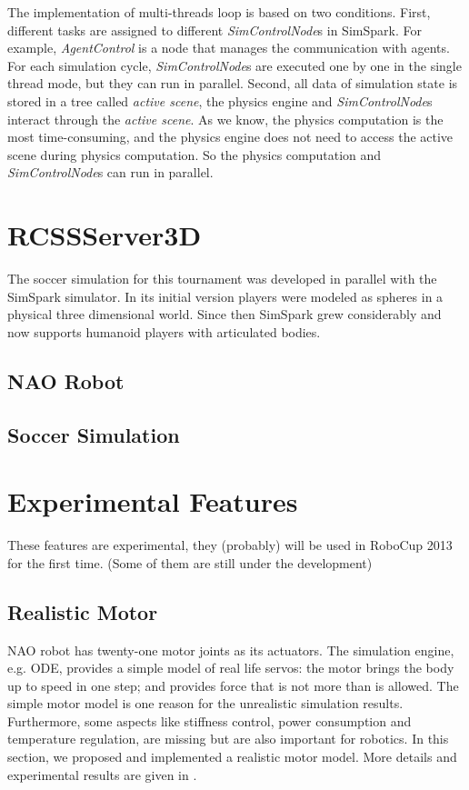 \documentclass{llncs}
\begin{document}
The implementation of multi-threads loop is based on two conditions.
First, different tasks are assigned to different \textit{SimControlNode}s in SimSpark.
For example, \textit{AgentControl} is a node that manages the communication with agents.
For each simulation cycle, \textit{SimControlNode}s are executed one by one in the single thread mode, but they can run in parallel.
Second, all data of simulation state is stored in a tree called \textit{active scene},
the physics engine and \textit{SimControlNode}s interact through the \textit{active scene}.
As we know, the physics computation is the most time-consuming, and the physics engine does not need to access the active scene during physics computation.
So the physics computation and \textit{SimControlNode}s can run in parallel.


\section{RCSSServer3D}
\label{s:rcssserver3d}

The soccer simulation for this tournament was developed in parallel with the SimSpark simulator. In its initial version players were modeled as spheres in a physical three dimensional world. Since then SimSpark grew considerably and now supports humanoid players with articulated bodies.

\subsection{NAO Robot}
\subsection{Soccer Simulation}

\section{Experimental Features}
\label{s:ongoing}
These features are experimental, they (probably) will be used in RoboCup 2013 for the first time. (Some of them are still under the development)

\subsection{Realistic Motor}
NAO robot has twenty-one motor joints as its actuators.
The simulation engine, e.g. ODE, provides a simple model of real life servos:
the motor brings the body up to speed in one step; and provides force that is not more than is allowed.
The simple motor model is one reason for the unrealistic simulation results.
Furthermore, some aspects like stiffness control, power consumption and temperature regulation, are missing but are also important for robotics.
In this section, we proposed and implemented a realistic motor model. More details and experimental results are given in \cite{Xu2012}.
\end{document}
